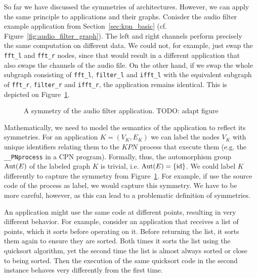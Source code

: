 So far we have discussed the symmetries of architectures.
However, we can apply the same principle to applications and their graphs.
Conisder the audio filter example application from Section~\ref{sec:kpn_basic} (cf. Figure~\ref{fig:audio_filter_graph}). 
The left and right channels perform precisely the same computation on different data.
We could not, for example, just swap the \texttt{fft\_l} and \texttt{fft\_r} nodes, since that would result in a different application that also swaps the channels of the audio file.
On the other hand, if we swap the whole subgraph consisting of \texttt{fft\_l}, \texttt{filter\_l} and \texttt{ifft\_l} with the equivalent subgraph of \texttt{fft\_r}, \texttt{filter\_r} and \texttt{ifft\_r}, the application remains identical.
This is depicted on Figure~\ref{fig:audio_filter_symmetries}.

\begin{figure}[h]
	\centering
\resizebox{0.9\textwidth}{!}{
\begin{tikzpicture}
   
 \end{tikzpicture}
}
   \caption{A symmetry of the audio filter application. TODO: adapt figure}
	\label{fig:audio_filter_symmetries}
\end{figure}

Mathematically, we need to model the semantics of the application to reflect its symmetries.
For an application $K = (V_K,E_K)$ we can label the nodes $V_K$ with unique identifiers relating them to the $KPN$ process that execute them (e.g. the \texttt{\_\_PNprocess} in a \ac{CPN} program). 
Formally, thus, the automorphism group $\operatorname{Aut}(E)$ of the labeled graph $K$ is trivial, i.e. $\operatorname{Aut}(E) = \{ \operatorname{id} \}$. 
We could label $K$ differently to capture the symmetry from Figure~\ref{fig:audio_filter_symmetries}.
For example, if use the source code of the process as label, we would capture this symmetry.
We have to be more careful, however, as this can lead to a problematic definition of symmetries.

An application might use the same code at different points, resulting in very different behavior.
For example, consider an application that receives a list of points, which it sorts before operating on it.
Before returning the list, it sorts them again to ensure they are sorted.
Both times it sorts the list using the quicksort algorithm, yet the second time the list is almost always sorted or close to being sorted.
Then the execution of the same quicksort code in the second instance behaves very differently from the first time.

